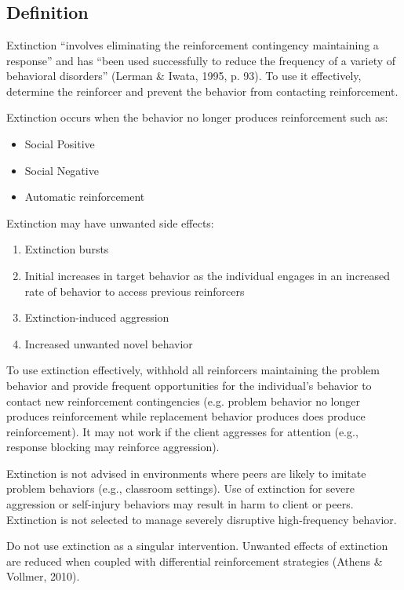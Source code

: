 \section{\fourdEighteen{}}
\subsection{Definition}
Extinction ``involves eliminating the reinforcement contingency maintaining a response'' and has ``been used successfully to reduce the frequency of a variety of behavioral disorders'' (Lerman \& Iwata, 1995, p. 93). To use it effectively, determine the reinforcer and prevent the behavior from contacting reinforcement. 

Extinction occurs when the behavior no longer produces reinforcement such as:
\begin{itemize}
\item Social Positive
\item Social Negative
\item Automatic reinforcement 
\end{itemize}

Extinction may have unwanted side effects:
\begin{enumerate}
\item Extinction bursts
\item Initial increases in target behavior as the individual engages in an increased rate of behavior to access previous reinforcers
\item Extinction-induced aggression
\item Increased unwanted novel behavior
\end{enumerate}

To use extinction effectively, withhold all reinforcers maintaining the problem behavior and provide frequent opportunities for the individual's behavior to contact new reinforcement contingencies (e.g. problem behavior no longer produces reinforcement while replacement behavior produces does produce reinforcement). It may not work if the client aggresses for attention (e.g., response blocking may reinforce aggression).

Extinction is not advised in environments where peers are likely to imitate problem behaviors (e.g., classroom settings). Use of extinction for severe aggression or self-injury behaviors may result in harm to client or peers. Extinction is not selected to manage severely disruptive high-frequency behavior.

Do not use extinction as a singular intervention. Unwanted effects of extinction are reduced when coupled with differential reinforcement strategies (Athens \& Vollmer, 2010).
%
